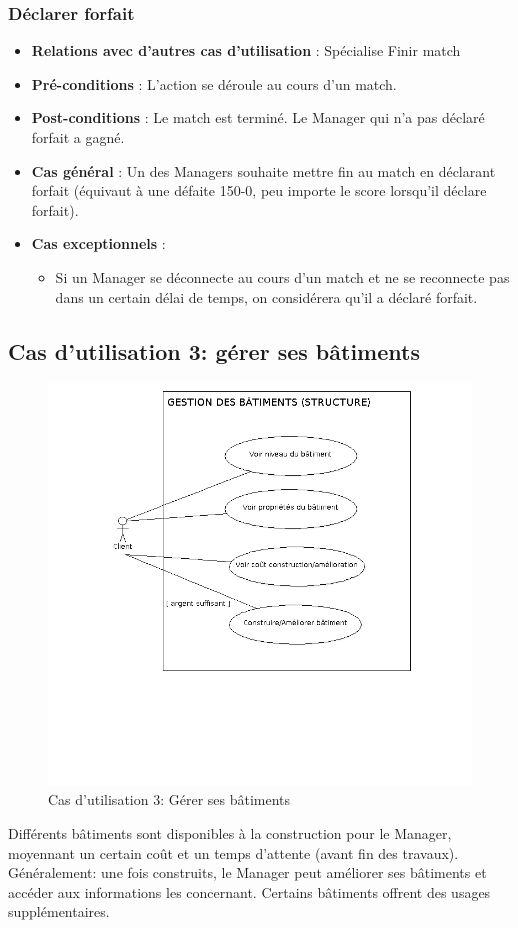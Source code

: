 \documentclass[a4paper,titlepage]{scrreprt}
\begin{document}
    \subsubsection{Déclarer forfait}
      \begin{itemize}
        \item \textbf{Relations avec d'autres cas d'utilisation}  : Spécialise Finir match
        \item \textbf{Pré-conditions} : L'action se déroule au cours d'un match.
        \item \textbf{Post-conditions} : Le match est terminé. Le Manager qui n'a pas déclaré forfait a gagné.
        \item \textbf{Cas général} : Un des Managers souhaite mettre fin au match en déclarant forfait (équivaut à une défaite 150-0, peu importe le score lorsqu’il déclare forfait).
        \item \textbf{Cas exceptionnels} :
          \begin{itemize}
            \item Si un Manager se déconnecte au cours d’un match et ne se reconnecte pas dans un certain délai de temps, on considérera qu’il a déclaré forfait.
          \end{itemize}
      \end{itemize}


  \subsection{Cas d'utilisation 3: gérer ses bâtiments}
    \begin{figure}[H]
    \center
    \includegraphics[scale=0.5]{uml/useCaseView/Gestiondesbatimentsstructure.png}
    \caption{Cas d'utilisation 3: Gérer ses bâtiments}
  \end{figure}	
 Différents bâtiments sont disponibles à la construction pour le Manager, 
  moyennant un certain coût et un temps d'attente (avant fin des travaux). 
  Généralement: une fois construits, le Manager peut améliorer ses bâtiments 
  et accéder aux informations les concernant. Certains bâtiments offrent 
  des usages supplémentaires.
\end{document}
